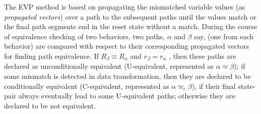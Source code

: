 The EVP method \cite{Chouksey18} is based on propagating the mismatched
variable values (as \textit{propagated vectors}) over a path to the subsequent
paths until the values match or the final path segments end in the reset
state without a match.  During the course of equivalence checking of
two behaviors, two paths, $\alpha$ and $\beta$ say, (one from each behavior)
are compared with respect to their corresponding propagated vectors for finding
path equivalence. If $R_{\beta}\equiv R_{\alpha}$ and $r_{\beta}=r_{\alpha}$ ,
then these paths are declared as unconditionally equivalent (U-equivalent,
represented as $\alpha \simeq \beta$); if some mismatch is detected in data
transformation, then they are declared to be conditionally equivalent
(C-equivalent, represented as $\alpha \simeq_c \beta$), if their final
state-pair always eventually lead to some U-equivalent paths; otherwise they
are declared to be not equivalent.

